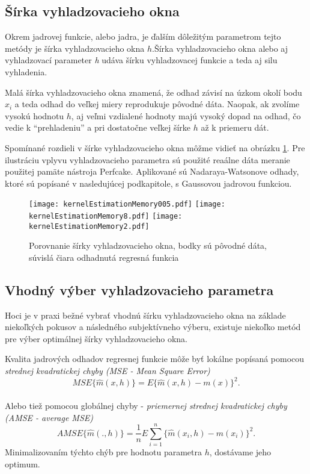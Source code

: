 \subsection{Šírka vyhladzovacieho okna}

Okrem jadrovej funkcie, alebo jadra, je ďalším dôležitým parametrom tejto metódy je šírka vyhladzovacieho okna $h$.Šírka vyhladzovacieho okna alebo aj vyhladzovací parameter \textit{h} udáva šírku vyhladzovacej funkcie a teda aj silu vyhladenia. 

Malá šírka vyhladzovacieho okna znamená, že odhad závisí na úzkom okolí bodu $x_i$ a teda odhad do veľkej miery reprodukuje pôvodné dáta. Naopak, ak zvolíme vysokú hodnotu $h$, aj veľmi vzdialené hodnoty majú vysoký dopad na odhad, čo vedie k ``prehladeniu'' a pri dostatočne veľkej šírke $h$ až k priemeru dát.

 Spomínané rozdieli v šírke vyhladzovacieho okna môžme vidieť na obrázku \ref{porovnanieSirky}. Pre ilustráciu vplyvu vyhladzovacieho parametra sú použité reaálne dáta meranie použitej pamäte nástroja Perfcake. Aplikované sú Nadaraya-Watsonove odhady, ktoré sú popísané v nasledujúcej podkapitole, s Gaussovou jadrovou funkciou. 
 
 \begin{figure}[!ht]
  \texttt{[image: kernelEstimationMemory005.pdf]}
  \texttt{[image: kernelEstimationMemory8.pdf]}
  \centering
  \texttt{[image: kernelEstimationMemory2.pdf]}
  \caption{Porovnanie šírky vyhladzovacieho okna, bodky sú pôvodné dáta, súvislá čiara odhadnutá regresná funkcia}\label{porovnanieSirky}
\end{figure}

\subsection{Vhodný výber vyhladzovacieho parametra}
Hoci je v praxi bežné vybrať vhodnú šírku vyhladzovacieho okna na základe niekoľkých pokusov a následného subjektívneho výberu, existuje niekoľko metód pre výber optimálnej šírky vyhladzovacieho okna.

Kvalita jadrových odhadov regresnej funkcie môže byť lokálne popísaná pomocou \textit{strednej kvadratickej chyby (MSE - Mean Square Error)}
\begin{equation*}
MSE\{\hat{m}(x,h)\} = E{\{\hat{m}(x,h) - m(x)\}}^2.
\end{equation*} 
\\
Alebo tiež pomocou globálnej chyby - \textit{priemernej strednej kvadratickej chyby (AMSE - average MSE)}
\begin{equation*}
AMSE\{\hat{m}(.,h)\} = \frac{1}{n}E\sum\limits_{i=1}^{n} {\{\hat{m}(x_i,h) - m(x_i)\}}^2.
\end{equation*}
Minimalizovaním týchto chýb pre hodnotu parametra $h$, dostávame jeho optimum.

